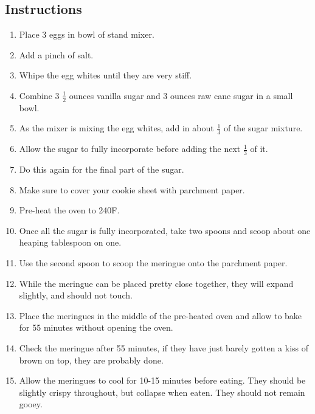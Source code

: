 \begin{multicols}{2}
\subsection*{Instructions}
\begin{enumerate}
    \item Place 3 eggs in bowl of stand mixer.
    \item Add a pinch of salt.
    \item Whipe the egg whites until they are very stiff.
    \item Combine 3 \( \frac{1}{2} \) ounces vanilla sugar and 3 ounces raw cane sugar in a small bowl.
    \item As the mixer is mixing the egg whites, add in about \( \frac{1}{3} \) of the sugar mixture.
    \item Allow the sugar to fully incorporate before adding the next \( \frac{1}{3} \) of it.
    \item Do this again for the final part of the sugar.
    \item Make sure to cover your cookie sheet with parchment paper.
    \item Pre-heat the oven to 240F.
    \item Once all the sugar is fully incorporated, take two spoons and scoop about one heaping tablespoon on one.
    \item Use the second spoon to scoop the meringue onto the parchment paper.
    \item While the meringue can be placed pretty close together, they will expand slightly, and should not touch.
    \item Place the meringues in the middle of the pre-heated oven and allow to bake for 55 minutes without opening the oven.
    \item Check the meringue after 55 minutes, if they have just barely gotten a kiss of brown on top, they are probably done.
    \item Allow the meringues to cool for 10-15 minutes before eating. They should be slightly crispy throughout, but collapse when eaten. They should not remain gooey.
\end{enumerate}


\end{multicols}
